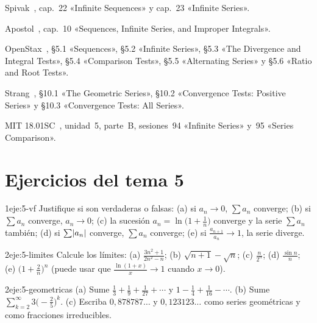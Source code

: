 \begin{lecturas}
\item Spivak~\cite{spivak}, cap.~22 «Infinite Sequences» y cap.~23 «Infinite Series».
\item Apostol~\cite{apostol}, cap.~10 «Sequences, Infinite Series, and Improper Integrals».
\item OpenStax~\cite{openstax2}, §5.1 «Sequences», §5.2 «Infinite Series», §5.3 «The Divergence and Integral Tests», §5.4 «Comparison Tests», §5.5 «Alternating Series» y §5.6 «Ratio and Root Tests».
\item Strang~\cite{strang}, §10.1 «The Geometric Series», §10.2 «Convergence Tests: Positive Series» y §10.3 «Convergence Tests: All Series».
\item MIT 18.01SC~\cite{mit1801}, unidad~5, parte~B, sesiones~94 «Infinite Series» y~95 «Series Comparison».
\end{lecturas}

\section*{Ejercicios del tema 5}

\begin{ejercicio}{1}{eje:5-vf}
Justifique si son verdaderas o falsas: (a) si $a_n\to0$, $\sum a_n$ converge; (b) si $\sum a_n$ converge, $a_n\to0$; (c) la sucesión $a_n=\ln\bigl(1+\frac1n\bigr)$ converge y la serie $\sum a_n$ también; (d) si $\sum\lvert a_n\rvert$ converge, $\sum a_n$ converge; (e) si $\frac{a_{n+1}}{a_n}\to1$, la serie diverge.
\end{ejercicio}

\begin{ejercicio}{2}{eje:5-limites}
Calcule los límites: (a) $\frac{3n^{2}+1}{2n^{2}-n}$; (b) $\sqrt{n+1}-\sqrt{n}$; (c) $\frac{n}{2^{n}}$; (d) $\frac{\sin n}{n}$; (e) $\bigl(1+\frac2n\bigr)^{n}$ (puede usar que $\frac{\ln(1+x)}{x}\to1$ cuando $x\to0$).
\end{ejercicio}

\begin{ejercicio}{2}{eje:5-geometricas}
(a) Sume $\frac13+\frac19+\frac{1}{27}+\cdots$ y $1-\frac14+\frac{1}{16}-\cdots$. (b) Sume $\sum_{k=2}^{\infty}3\bigl(-\frac25\bigr)^{k}$. (c) Escriba $0{,}878787\ldots$ y $0{,}123123\ldots$ como series geométricas y como fracciones irreducibles.
\end{ejercicio}

